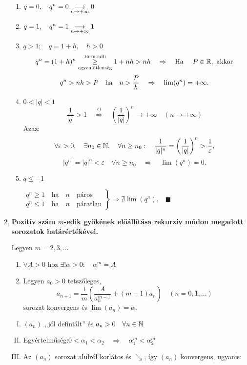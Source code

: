 \documentclass[a4paper,11.5pt]{article}
\begin{document}
\begin{enumerate}
		\biz
		\begin{enumerate}
			\item $q=0,\quad q^n=0\underset{n\rightarrow+\infty}{\longrightarrow}0$\quad \checkmark
			\item $q=1,\quad q^n=1\underset{n\rightarrow+\infty}{\longrightarrow}1$\quad \checkmark
			\item $q>1:\quad q=1+h,\quad  h>0$
			\[ q^n =(1+h)^n\overset{\text{Bernoulli}}{\underset{\text{egyenlőtlenség}}{\geq}}1+nh>nh\quad \Rightarrow\quad \text{Ha }\quad P\in\mathbb{R},\text{ akkor} \]
			\[ q^n>nh>P\text{\quad ha\quad }n>\frac{P}{h} \quad \Rightarrow \quad \lim(q^n)=+\infty.\]
			\item $0<|q|<1$
			\[ \frac{1}{|q|}>1\quad \overset{c)}{\Longrightarrow}\quad \left(\frac{1}{|q|}\right)^n\to+\infty\quad (n\to+\infty) \]
			Azaz:
			\[ \forall\varepsilon>0,\quad \exists n_0\in\mathbb{N}, \quad \forall n\geq n_0:\quad \frac{1}{|q|^n}=\left(\frac{1}{|q|}\right)^n>\frac{1}{\varepsilon}, \]
			\[ |q^n|=|q|^n<\varepsilon\quad \forall n\geq n_0\quad \Rightarrow\quad \lim(q^n)=0. \]
			\item $q\leq -1$
			
			$\left.\begin{gathered}
			q^n\geq1 \quad \text{ha}\quad  n \quad \text{páros} \\
			q^n\leq1 \quad \text{ha}\quad n \quad \text{páratlan}
			\end{gathered}\right\} \Rightarrow$\quad $\nexists\lim(q^n).\quad \blacksquare$
			
		\end{enumerate}
		
		\item \textbf{Pozitív szám $m$-edik gyökének előállítása rekurzív módon megadott sorozatok határértékével.}
		
		Legyen $m=2,3,\ldots$
		\begin{enumerate}
			\item  $\forall A>0$-hoz $\exists!\alpha>0:\quad \alpha^m=A$
			\item Legyen $a_0>0$ tetszőleges,
			\[ a_{n+1}=\frac{1}{m}\left(\frac{A}{a_n^{m-1}}+(m-1)a_n\right)\quad (n=0,1,\ldots) \]
			sorozat konvergens és $\lim(a_n)=\alpha.$
		\end{enumerate}
		
		\biz
		\begin{enumerate}[I. lépés:]
			\item $(a_n)$ ,,jól definiált'' és $a_n>0\quad \forall n\in\mathbb{N}$
			\item Egyértelműség:\quad $0<\alpha_1<\alpha_2\quad \Rightarrow\quad \alpha_1^m<\alpha_2^m$
			\item Az $(a_n)$ sorozat alulról korlátos és $\searrow$, így $(a_n)$ konvergens, ugyanis:
			

\end{enumerate}
\end{enumerate}
\end{document}
